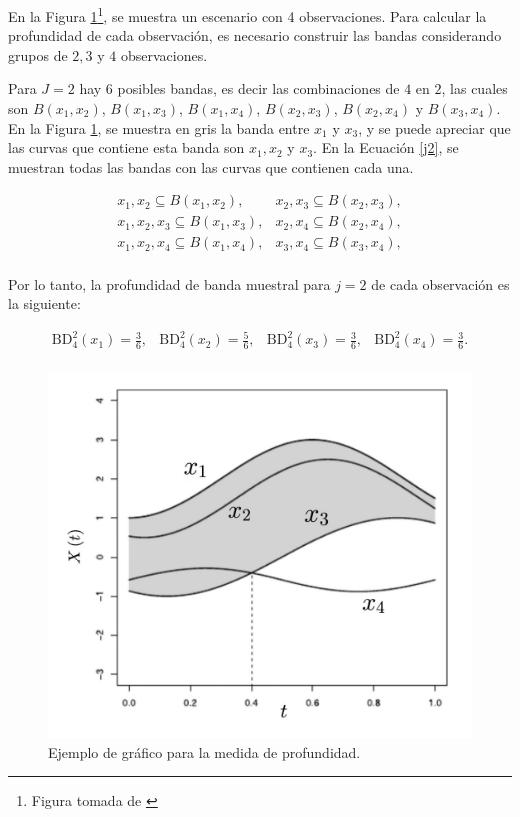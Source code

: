 \begin{ejemplo}
   En la Figura \ref{fig:CurvasX}\footnote{
Figura tomada de \cite{boxplotFun}}, se muestra un escenario con 4 observaciones. Para calcular la profundidad de cada observación, es necesario construir las bandas considerando grupos de $2, 3$ y $4$ observaciones.
    
    Para $J = 2$ hay $6$ posibles bandas, es decir las combinaciones de $4$ en $2$, las cuales son $B(x_1, x_2)$, $B(x_1, x_3)$, $B(x_1, x_4)$, $B(x_2, x_3)$, $B(x_2, x_4)$ y $B(x_3, x_4)$. En la Figura \ref{fig:CurvasX}, se muestra en gris la banda entre $x_1$ y $x_3$, y se puede apreciar que las curvas que contiene esta banda son $x_1, x_2$ y $x_3$. En la Ecuación \eqref{j2}, se muestran todas las bandas con las curvas que contienen cada una.
    
    \begin{equation}\label{j2}
        \begin{matrix}
        x_1,x_2 \subseteq  B(x_1, x_2),  & x_2,x_3 \subseteq  B(x_2, x_3), \\
        x_1,x_2, x_3 \subseteq  B(x_1, x_3),  & x_2,x_4 \subseteq  B(x_2, x_4), \\
        x_1,x_2, x_4 \subseteq  B(x_1, x_4),  & x_3,x_4 \subseteq  B(x_3, x_4), \\
    \end{matrix}
    \end{equation}

    Por lo tanto, la profundidad de banda muestral para $j = 2$ de cada observación es la siguiente:

    \begin{equation}
        \begin{matrix}
            \mathrm{BD}^{2}_4(x_1) = \frac{3}{6}, & \mathrm{BD}^{2}_4(x_2) = \frac{5}{6},  & \mathrm{BD}^{2}_4(x_3) = \frac{3}{6},  & \mathrm{BD}^{2}_4(x_4) = \frac{3}{6}. \\
        \end{matrix}        
    \end{equation}
    
    \begin{figure}[H]
    \centering
    \includegraphics[width = 0.6 \textwidth]{Imagenes/WhatsApp Image 2024-04-21 at 8.06.25 PM.jpeg}
    \caption{Ejemplo de gráfico para la medida de profundidad.}
    \label{fig:CurvasX}
\end{figure}


\end{ejemplo}
